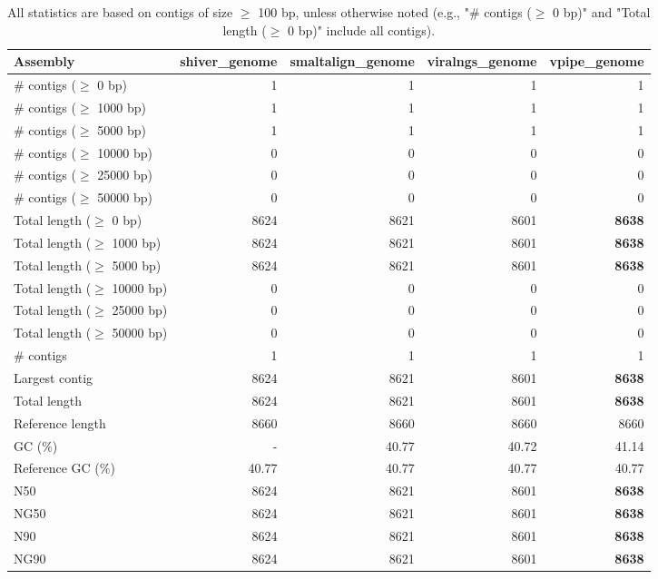 \documentclass[12pt,a4paper]{article}
\begin{document}
\begin{table}[ht]
\begin{center}
\caption{All statistics are based on contigs of size $\geq$ 100 bp, unless otherwise noted (e.g., "\# contigs ($\geq$ 0 bp)" and "Total length ($\geq$ 0 bp)" include all contigs).}
\begin{tabular}{|l*{4}{|r}|}
\hline
Assembly & shiver\_genome & smaltalign\_genome & viralngs\_genome & vpipe\_genome \\ \hline
\# contigs ($\geq$ 0 bp) & 1 & 1 & 1 & 1 \\ \hline
\# contigs ($\geq$ 1000 bp) & 1 & 1 & 1 & 1 \\ \hline
\# contigs ($\geq$ 5000 bp) & 1 & 1 & 1 & 1 \\ \hline
\# contigs ($\geq$ 10000 bp) & 0 & 0 & 0 & 0 \\ \hline
\# contigs ($\geq$ 25000 bp) & 0 & 0 & 0 & 0 \\ \hline
\# contigs ($\geq$ 50000 bp) & 0 & 0 & 0 & 0 \\ \hline
Total length ($\geq$ 0 bp) & 8624 & 8621 & 8601 & {\bf 8638} \\ \hline
Total length ($\geq$ 1000 bp) & 8624 & 8621 & 8601 & {\bf 8638} \\ \hline
Total length ($\geq$ 5000 bp) & 8624 & 8621 & 8601 & {\bf 8638} \\ \hline
Total length ($\geq$ 10000 bp) & 0 & 0 & 0 & 0 \\ \hline
Total length ($\geq$ 25000 bp) & 0 & 0 & 0 & 0 \\ \hline
Total length ($\geq$ 50000 bp) & 0 & 0 & 0 & 0 \\ \hline
\# contigs & 1 & 1 & 1 & 1 \\ \hline
Largest contig & 8624 & 8621 & 8601 & {\bf 8638} \\ \hline
Total length & 8624 & 8621 & 8601 & {\bf 8638} \\ \hline
Reference length & 8660 & 8660 & 8660 & 8660 \\ \hline
GC (\%) & - & 40.77 & 40.72 & 41.14 \\ \hline
Reference GC (\%) & 40.77 & 40.77 & 40.77 & 40.77 \\ \hline
N50 & 8624 & 8621 & 8601 & {\bf 8638} \\ \hline
NG50 & 8624 & 8621 & 8601 & {\bf 8638} \\ \hline
N90 & 8624 & 8621 & 8601 & {\bf 8638} \\ \hline
NG90 & 8624 & 8621 & 8601 & {\bf 8638} \\ \hline

\end{tabular}
\end{center}
\end{table}
\end{document}

